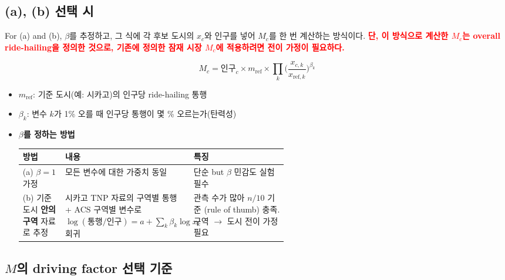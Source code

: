 \documentclass[10pt,a4paper]{article}
\newcommand{\red}[1]{\textcolor{red}{#1}}
\begin{document}
\begin{mdframed}[linecolor=red!60,linewidth=2pt]
\color{black!60}


\section{(a), (b) 선택 시}
For (a) and (b), $\beta$를 추정하고, 그 식에 각 후보 도시의 $x_c$와 인구를 넣어 $M_c$를 한 번 계산하는 방식이다. \red{\textbf{단, 이 방식으로 계산한 $M_c$는 overall ride-hailing을 정의한 것으로, 기존에 정의한 잠재 시장 $M_c$에 적용하려면 전이 가정이 필요하다.}}

\[
M_c=\text{인구}_c\times m_{\mathrm{ref}}\times\prod_{k}\Big(\frac{x_{c,k}}{x_{\mathrm{ref},k}}\Big)^{\beta_k}
\]
\begin{itemize}[leftmargin=1.5em,itemsep=1pt]
\item $m_{\mathrm{ref}}$: 기준 도시(예: 시카고)의 인구당 ride-hailing 통행
\item $\beta_k$: 변수 $k$가 1\% 오를 때 인구당 통행이 몇 \% 오르는가(탄력성)


\item \textbf{$\beta$를 정하는 방법}

{\small
\begin{tabularx}{\linewidth}{@{}>{\raggedright\arraybackslash}p{0.16\linewidth}>{\raggedright\arraybackslash}p{0.38\linewidth}Y@{}}
\toprule
방법 & 내용 & 특징 \\ \midrule
(a) $\beta=1$ 가정
  & 모든 변수에 대한 가중치 동일
  & 단순 but $\beta$ 민감도 실험 필수\\
(b) 기준 도시 \textbf{안의 구역} 자료로 추정
  & 시카고 TNP 자료의 구역별 통행 + ACS 구역별 변수로
    $\log(\text{통행}/\text{인구})=a+\sum_k\beta_k\log x_k$ 회귀
  & 관측 수가 많아 $n/10$ 기준 (rule of thumb) 충족. 구역 $\to$ 도시 전이 가정 필요 \\

\bottomrule
\end{tabularx}
}

\end{itemize}

\subsection{$M$의 driving factor 선택 기준}


\end{mdframed}
\end{document}
